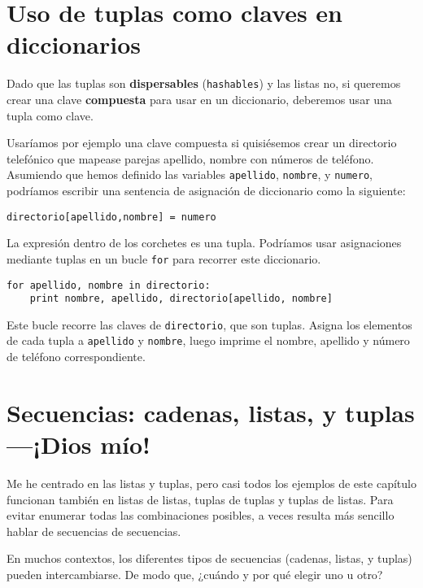 \section{Uso de tuplas como claves en diccionarios}


Dado que las tuplas son {\bf dispersables} ({\tt hashables}) y las listas no, si queremos
crear una clave {\bf compuesta} para usar en un diccionario, deberemos usar una tupla
como clave.

Usaríamos por ejemplo una clave compuesta si quisiésemos crear un
directorio telefónico que mapease
parejas apellido, nombre con números de teléfono. Asumiendo
que hemos definido las variables
{\tt apellido}, {\tt nombre}, y {\tt numero}, podríamos escribir
una sentencia de asignación de diccionario como la siguiente:

\beforeverb
\begin{verbatim}
directorio[apellido,nombre] = numero
\end{verbatim}
\afterverb
%
La expresión dentro de los corchetes es una tupla. Podríamos usar
asignaciones mediante tuplas en un bucle {\tt for} para recorrer este diccionario.


\beforeverb
\begin{verbatim}
for apellido, nombre in directorio:
    print nombre, apellido, directorio[apellido, nombre]
\end{verbatim}
\afterverb
%
Este bucle recorre las claves de {\tt directorio}, que son tuplas.
Asigna los elementos de cada tupla a {\tt apellido} y {\tt nombre}, luego
imprime el nombre, apellido y número de teléfono correspondiente.

\section{Secuencias: cadenas, listas, y tuplas---¡Dios mío!}

Me he centrado en las listas y tuplas, pero casi todos los ejemplos de
este capítulo funcionan también en listas de listas, tuplas de tuplas y
tuplas de listas. Para evitar enumerar todas las combinaciones posibles,
a veces resulta más sencillo hablar de secuencias de secuencias.

En muchos contextos, los diferentes tipos de secuencias (cadenas, listas, y
tuplas) pueden intercambiarse. De modo que, ¿cuándo y por qué elegir uno
u otro?

